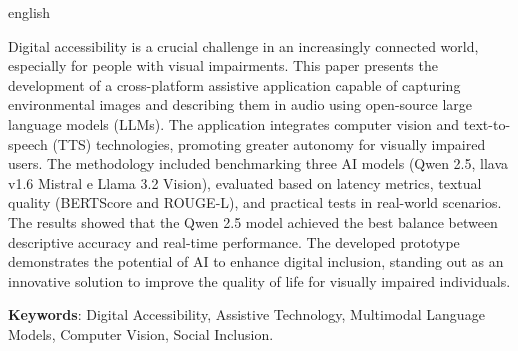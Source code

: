 \begin{resumo}[Abstract]
	
	\begin{otherlanguage*}{english}
		
	Digital accessibility is a crucial challenge in an increasingly connected world, especially for people with visual impairments. This paper presents the development of a cross-platform assistive application capable of capturing environmental images and describing them in audio using open-source large language models (LLMs). The application integrates computer vision and text-to-speech (TTS) technologies, promoting greater autonomy for visually impaired users. The methodology included benchmarking three AI models (Qwen 2.5, llava v1.6 Mistral e Llama 3.2 Vision), evaluated based on latency metrics, textual quality (BERTScore and ROUGE-L), and practical tests in real-world scenarios. The results showed that the Qwen 2.5 model achieved the best balance between descriptive accuracy and real-time performance. The developed prototype demonstrates the potential of AI to enhance digital inclusion, standing out as an innovative solution to improve the quality of life for visually impaired individuals.
	
    \textbf{Keywords}: Digital Accessibility, Assistive Technology, Multimodal Language Models, Computer Vision, Social Inclusion.
		
	\end{otherlanguage*}

\end{resumo} 